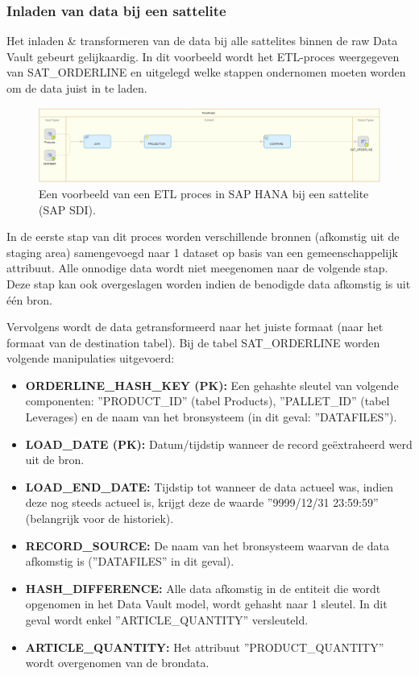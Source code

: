 \subsubsection{Inladen van data bij een sattelite}
Het inladen \& transformeren van de data bij alle sattelites binnen de raw Data Vault gebeurt gelijkaardig. In dit voorbeeld wordt het ETL-proces weergegeven van SAT\_ORDERLINE en uitgelegd welke stappen ondernomen moeten worden om de data juist in te laden.
\begin{figure}[h]
	\centering
	\includegraphics[scale=0.45]{../images/DV_FG_sattelite.png}
	\caption{Een voorbeeld van een ETL proces in SAP HANA bij een sattelite (SAP SDI).}
	\label{fig:etlsat}
\end{figure}

In de eerste stap van dit proces worden verschillende bronnen (afkomstig uit de staging area) samengevoegd naar 1 dataset op basis van een gemeenschappelijk attribuut. Alle onnodige data wordt niet meegenomen naar de volgende stap. Deze stap kan ook overgeslagen worden indien de benodigde data afkomstig is uit één bron.

Vervolgens wordt de data getransformeerd naar het juiste formaat (naar het formaat van de destination tabel). Bij de tabel SAT\_ORDERLINE worden volgende manipulaties uitgevoerd:

\begin{itemize}
	\item \textbf{ORDERLINE\_HASH\_KEY (PK):} Een gehashte sleutel van volgende componenten: ''PRODUCT\_ID'' (tabel Products), ''PALLET\_ID'' (tabel Leverages) en de naam van het bronsysteem (in dit geval: ''DATAFILES'').
	\item \textbf{LOAD\_DATE (PK):} Datum/tijdstip wanneer de record geëxtraheerd werd uit de bron.
	\item \textbf{LOAD\_END\_DATE:} Tijdstip tot wanneer de data actueel was, indien deze nog steeds actueel is, krijgt deze de waarde ''9999/12/31 23:59:59'' (belangrijk voor de historiek).
	\item \textbf{RECORD\_SOURCE:} De naam van het bronsysteem waarvan de data afkomstig is (''DATAFILES'' in dit geval).
	\item \textbf{HASH\_DIFFERENCE:} Alle data afkomstig in de entiteit die wordt opgenomen in het Data Vault model, wordt gehasht naar 1 sleutel. In dit geval wordt enkel ''ARTICLE\_QUANTITY'' versleuteld. 
	\item \textbf{ARTICLE\_QUANTITY:} Het attribuut ''PRODUCT\_QUANTITY'' wordt overgenomen van de brondata.
\end{itemize} 

